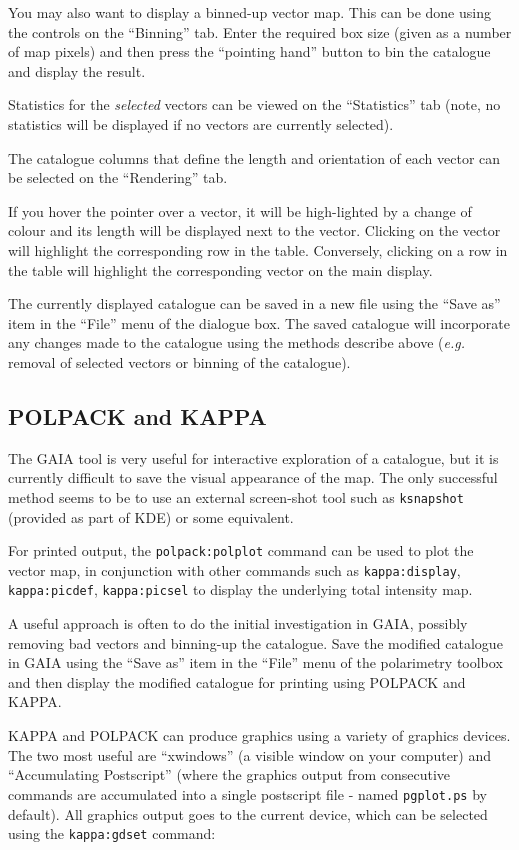 \documentclass[twoside,11pt]{starlink}
\begin{document}
You may also want to display a binned-up vector map. This can be done
using the controls on the ``Binning'' tab. Enter the required box size
(given as a number of map pixels) and then press the ``pointing hand''
button to bin the catalogue and display the result.

Statistics for the \emph{selected} vectors can be viewed on the
``Statistics'' tab (note, no statistics will be displayed if no vectors
are currently selected).

The catalogue columns that define the length and orientation of each
vector can be selected on the ``Rendering'' tab.

If you hover the pointer over a vector, it will be high-lighted by a
change of colour and its length will be displayed next to the vector.
Clicking on the vector will highlight the corresponding row in the table.
Conversely, clicking on a row in the table will highlight the
corresponding vector on the main display.

The currently displayed catalogue can be saved in a new file using the
``Save as'' item in the ``File'' menu of the dialogue box. The saved
catalogue will incorporate any changes made to the catalogue using
the methods describe above (\emph{e.g.} removal of selected vectors or
binning of the catalogue).

\subsection{POLPACK and KAPPA}
The GAIA tool is very useful for interactive exploration of a catalogue,
but it is currently difficult to save the visual appearance of the map. The
only successful method seems to be to use an external screen-shot tool such
as \texttt{ksnapshot} (provided as part of KDE) or some equivalent.

For printed output, the \texttt{polpack:polplot} command can be used to
plot the vector map, in conjunction with other commands such as
\texttt{kappa:display}, \texttt{kappa:picdef}, \texttt{kappa:picsel} to
display the underlying total intensity map.

A useful approach is often to do the initial investigation in GAIA,
possibly removing bad vectors and binning-up the catalogue. Save the
modified catalogue in GAIA using the ``Save as'' item in the ``File''
menu of the polarimetry toolbox and then display the modified catalogue
for printing using POLPACK and KAPPA.

KAPPA and POLPACK can produce graphics using a variety of graphics
devices. The two most useful are ``xwindows'' (a visible window on your
computer) and ``Accumulating Postscript'' (where the graphics output from
consecutive commands are accumulated into a single postscript file - named
\texttt{pgplot.ps} by default). All graphics output goes to the current
device, which can be selected using the \texttt{kappa:gdset} command:
\end{document}

